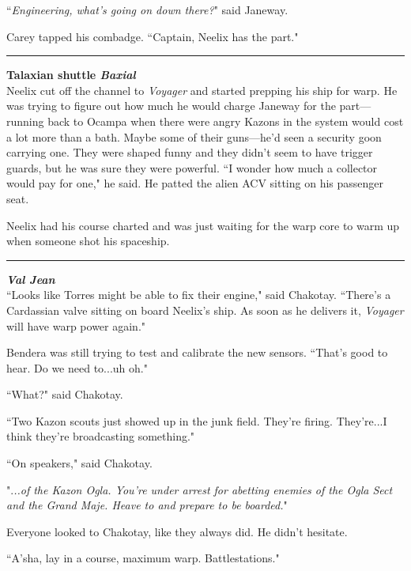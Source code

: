 \documentclass[twoside,letterpaper,12pt]{memoir}
\begin{document}
``\textit{Engineering, what's going on down there?}" said Janeway.

Carey tapped his combadge. ``Captain, Neelix has the part."

\begin{center}\rule{3cm}{0.4 pt}\end{center}

\noindent\textbf{Talaxian shuttle \textit{Baxial}}\\

Neelix cut off the channel to \textit{Voyager} and started prepping his ship for warp. He was trying to figure out how much he would charge Janeway for the part---running back to Ocampa when there were angry Kazons in the system would cost a lot more than a bath. Maybe some of their guns---he'd seen a security goon carrying one. They were shaped funny and they didn't seem to have trigger guards, but he was sure they were powerful. ``I wonder how much a collector would pay for one," he said. He patted the alien ACV sitting on his passenger seat.

Neelix had his course charted and was just waiting for the warp core to warm up when someone shot his spaceship.

\begin{center}\rule{3cm}{0.4 pt}\end{center}

\noindent\textit{\textbf{Val Jean}}\\

``Looks like Torres might be able to fix their engine," said Chakotay. ``There’s a Cardassian valve sitting on board Neelix's ship. As soon as he delivers it, \textit{Voyager} will have warp power again."

Bendera was still trying to test and calibrate the new sensors. ``That's good to hear. Do we need to...uh oh."

``What?" said Chakotay.

``Two Kazon scouts just showed up in the junk field. They're firing. They're...I think they're broadcasting something."

``On speakers," said Chakotay.

".\textit{..of the Kazon Ogla. You're under arrest for abetting enemies of the Ogla Sect and the Grand Maje. Heave to and prepare to be boarded.}"

Everyone looked to Chakotay, like they always did. He didn't hesitate.

``A'sha, lay in a course, maximum warp. Battlestations."
\end{document}
